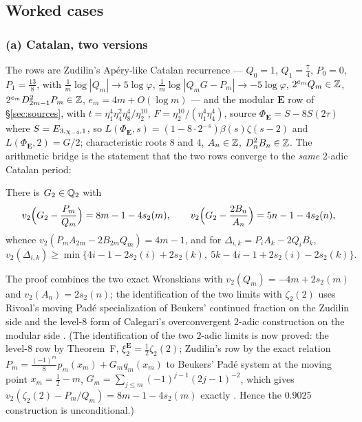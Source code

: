 \subsection{Worked cases}\label{sec:worked}



\subsubsection*{(a) Catalan, two versions}

The rows are Zudilin's Ap\'ery-like Catalan recurrence \cite{Zudilin2002a,
Zudilin2002b} --- $Q_0=1$, $Q_1=\tfrac74$, $P_0=0$, $P_1=\tfrac{13}8$, with
$\tfrac1m\log|Q_m|\to5\log\varphi$, $\tfrac1m\log|Q_mG-P_m|\to-5\log\varphi$,
$2^{e_m}Q_m\in\mathbb{Z}$, $2^{e_m}D_{2m-1}^2P_m\in\mathbb{Z}$, $e_m=4m+O(\log m)$ --- and the
modular $\mathbf E$ row of \S\ref{sec:sources}, with
$t=\eta_1^4\eta_4^2\eta_8^4/\eta_2^{10}$,
$F=\eta_2^{10}/(\eta_1^4\eta_4^4)$, source
$\Phi_{\mathbf E}=S-8S(2\tau)$ where $S=E_{3,\chi_{-4},1}$, so
$L(\Phi_{\mathbf E},s)=(1-8\cdot2^{-s})\beta(s)\zeta(s-2)$ and
$L(\Phi_{\mathbf E},2)=G/2$; characteristic roots $8$ and $4$, $A_n\in\mathbb{Z}$,
$D_n^2B_n\in\mathbb{Z}$.  The arithmetic bridge is the statement that the two rows
converge to the \emph{same} $2$-adic Catalan period:

\begin{lemma}
\label{lem:G2}
There is $G_2\in\mathbb{Q}_2$ with
\[
v_2\Bigl(G_2-\frac{P_m}{Q_m}\Bigr)=8m-1-4s_2(m),\qquad
v_2\Bigl(G_2-\frac{2B_n}{A_n}\Bigr)=5n-1-4s_2(n),
\]
whence $v_2(P_mA_{2m}-2B_{2m}Q_m)=4m-1$, and for
$\Delta_{i,k}=P_iA_k-2Q_iB_k$,
\begin{equation}\label{eq:roof}
v_2(\Delta_{i,k})\ge\min\bigl\{4i-1-2s_2(i)+2s_2(k),\
5k-4i-1+2s_2(i)-2s_2(k)\bigr\}.
\end{equation}
\end{lemma}

The proof combines the two exact Wronskians with
$v_2(Q_m)=-4m+2s_2(m)$ and $v_2(A_n)=2s_2(n)$; the identification of the two
limits with $\zeta_2(2)$ uses Rivoal's moving Pad\'e specialization of Beukers'
continued fraction on the Zudilin side \cite{Rivoal2006} and the level-$8$ form
of Calegari's overconvergent $2$-adic construction on the modular side
\cite{Calegari2005}.  (The identification of the two $2$-adic limits is now proved: the level-$8$ row by Theorem~F, $\xi_2^{\mathbf E}=\tfrac12\zeta_2(2)$; Zudilin's row by the exact relation $P_m=\tfrac{(-1)^m}8p_m(x_m)+G_mq_m(x_m)$ to Beukers' Pad\'e system at the moving point $x_m=\tfrac12-m$, $G_m=\sum_{j\le m}(-1)^{j-1}(2j-1)^{-2}$, which gives $v_2(\zeta_2(2)-P_m/Q_m)=8m-1-4s_2(m)$ exactly \cite{ProjTheory03}. Hence the $0.9025$ construction is unconditional.)

